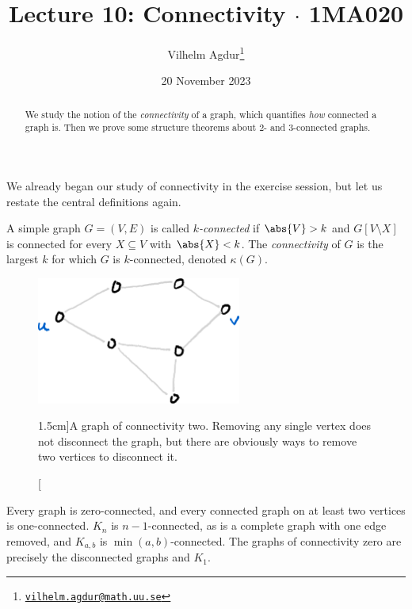 \documentclass[nobib]{tufte-handout}
\title{Lecture 10: Connectivity $\cdot$ 1MA020}
\author[Vilhelm Agdur]{Vilhelm Agdur\thanks{\href{mailto:vilhelm.agdur@math.uu.se}{\nolinkurl{vilhelm.agdur@math.uu.se}}}}
\date{20 November 2023}
\begin{document}
\maketitle%

\begin{abstract}
\noindent
We study the notion of the \emph{connectivity} of a graph, which quantifies \emph{how} connected a graph is. Then we prove some structure theorems about $2$- and $3$-connected graphs.
\end{abstract}

We already began our study of connectivity in the exercise session, but let us restate the central definitions again.

\begin{definition}
  A simple graph $G = (V,E)$ is called \emph{$k$-connected} if $\abs{V} > k$ and $G[V\setminus X]$ is connected for every $X \subseteq V$ with $\abs{X} < k$. The \emph{connectivity} of $G$ is the largest $k$ for which $G$ is $k$-connected, denoted $\kappa(G)$. 
\end{definition}

\begin{figure}
  \centering
  \includegraphics[width=0.6\textwidth]{graphics/L10_connectivity/twoconnected_graph.png}
  \caption[][1.5cm]{A graph of connectivity two. Removing any single vertex does not disconnect the graph, but there are obviously ways to remove two vertices to disconnect it.}
  \label{fig:twoconnected_graph}
\end{figure}

\begin{example}
  Every graph is zero-connected, and every connected graph on at least two vertices is one-connected. $K_n$ is $n-1$-connected, as is a complete graph with one edge removed, and $K_{a,b}$ is $\min(a,b)$-connected. The graphs of connectivity zero are precisely the disconnected graphs and $K_1$.
\end{example}
\end{document}
